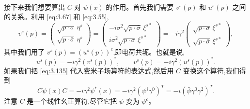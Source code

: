 接下来我们想要算出 $C$ 对 $\psi(x)$ 的作用。首先我们需要 $v^s(p)$ 和 $u^s(p)$ 之间的关系。利用 \eqref{eq:3.67} 和 \eqref{eq:3.55},
\begin{equation}
  v^s(p) = \begin{pmatrix}
    \sqrt{p\cdot\sigma}\,\eta^s\\
    \sqrt{p\cdot\bar{\sigma}}\,\eta^s
  \end{pmatrix}
  = \begin{pmatrix}
    -i\sigma^2\sqrt{p\cdot\bar{\sigma}}\,\xi^{s*}\\
    i\sigma^2\sqrt{p\cdot\sigma}\,\xi^{s*}
  \end{pmatrix}
  = -i\gamma^2\begin{pmatrix}
    \sqrt{p\cdot\sigma}\,\xi^{s*}\\
    \sqrt{p\cdot\bar{\sigma}}\,\xi^{s*}
  \end{pmatrix},
\end{equation}
其中我们用了 $v^s(p) = (u^s(p))^{c}$,即电荷共轭。也就是说,
\begin{equation}
  u^s(p) = -i\gamma^2(v^s(p))^{*},\qquad
  v^s(p) = -i\gamma^2(u^s(p))^{*}.
  \label{eq:3.135}
\end{equation}
如果我们把 \eqref{eq:3.135} 代入费米子场算符的表达式,然后用 $C$ 变换这个算符,我们得到
\begin{equation}
  C\psi(x)C = -i\gamma^2\psi^{*}(x) = -i\gamma^2(\psi^{\dagger}\gamma^0)^T
    = -i(\bar{\psi}\gamma^0\gamma^2)^T .
  \label{eq:3.136}
\end{equation}
注意 $C$ 是一个线性幺正算符,尽管它把 $\psi$ 变为 $\psi^{c}$。

